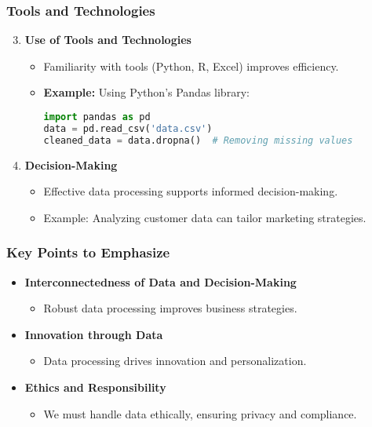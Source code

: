 \documentclass{beamer}
\begin{document}
\begin{frame}[fragile]
    \frametitle{Tools and Technologies}
    \begin{enumerate}
        \setcounter{enumi}{2}
        \item \textbf{Use of Tools and Technologies}
            \begin{itemize}
                \item Familiarity with tools (Python, R, Excel) improves efficiency.
                \item \textbf{Example:} Using Python's Pandas library:
                \begin{lstlisting}[language=Python]
import pandas as pd
data = pd.read_csv('data.csv')
cleaned_data = data.dropna()  # Removing missing values
                \end{lstlisting}
            \end{itemize}
        \item \textbf{Decision-Making}
            \begin{itemize}
                \item Effective data processing supports informed decision-making.
                \item Example: Analyzing customer data can tailor marketing strategies.
            \end{itemize}
    \end{enumerate}
\end{frame}

\begin{frame}[fragile]
    \frametitle{Key Points to Emphasize}
    \begin{itemize}
        \item \textbf{Interconnectedness of Data and Decision-Making}
            \begin{itemize}
                \item Robust data processing improves business strategies.
            \end{itemize}
        \item \textbf{Innovation through Data}
            \begin{itemize}
                \item Data processing drives innovation and personalization.
            \end{itemize}
        \item \textbf{Ethics and Responsibility}
            \begin{itemize}
                \item We must handle data ethically, ensuring privacy and compliance.
            \end{itemize}
    \end{itemize}
\end{frame}
\end{document}
